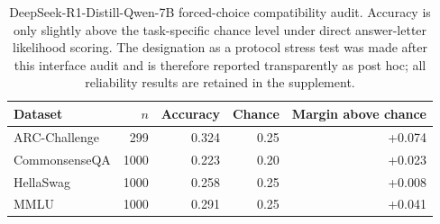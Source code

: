 \begin{table}[t]
\centering
\small
\caption{DeepSeek-R1-Distill-Qwen-7B forced-choice compatibility audit. Accuracy is only slightly above the task-specific chance level under direct answer-letter likelihood scoring. The designation as a protocol stress test was made after this interface audit and is therefore reported transparently as post hoc; all reliability results are retained in the supplement.}
\label{tab:deepseek-compatibility}
\begin{tabular}{lrrrr}
\toprule
Dataset & $n$ & Accuracy & Chance & Margin above chance \\
\midrule
ARC-Challenge & 299 & 0.324 & 0.25 & +0.074 \\
CommonsenseQA & 1000 & 0.223 & 0.20 & +0.023 \\
HellaSwag & 1000 & 0.258 & 0.25 & +0.008 \\
MMLU & 1000 & 0.291 & 0.25 & +0.041 \\
\bottomrule
\end{tabular}
\end{table}
